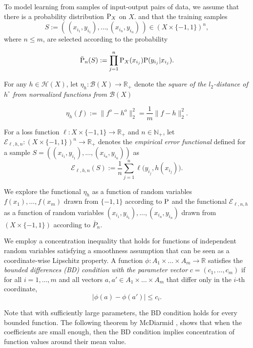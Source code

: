 \documentclass{elsarticle}
\def\n{\noindent}
\def\P{{\rm P}}
\def\cE{{\mathcal E}}
\def\cH{{\mathcal H}}
\def\cB{{\mathcal B}}
\def\bR{{\mathbb R}}
\def\bN{{\mathbb N}}
\def\n{\noindent}
\begin{document}
To model learning from samples of input-output pairs of data, we assume that there is a probability distribution $\P_X$ on $X$. and that the training samples
$$S := ( \, (x_{i_1},y_{i_1}), \dots, (x_{i_n}, y_{i_n}) \, ) \in (X \times \{-1,1\})^n,$$
\n where $n \leq m$, are selected according to the probability

$${\bar \P_n}(S) := \prod_{j=1}^n \P_X(x_{i_j})\P(y_{i_j}| x_{i_j}).$$

\n For any $h \in \cH(X)$,  let
$\eta_{h}: \cB(X) \to \bR_+$ denote the {\em square of the $l_2$-distance of $h^{\circ}$ from normalized functions from $\cB(X)$}

$$\eta_{h}(f) := \| f^o - h^o \|^2_2 = \frac{1}{m} \| f -h\|^2_2.$$

\n For a loss function $\ell: X \times \{-1,1\} \to \bR_+$  and $n \in\bN_+$, let
  $\cE_{\ell,h,n}: (X \times \{-1,1\})^n \to \bR_+$ denotes the {\em empirical error functional}
defined for a sample $S = ( (x_{i_1},y_{i_1}), \dots, (x_{i_n}, y_{i_n}) )$ as
 $$\cE_{\ell,h,n}(S) := \frac{1}{n} \sum_{j=1}^n \ell \bigl ( y_{i_j},h(x_{i_j}) \bigr ).$$


\n We explore the functional $\eta_{h}$ as a function of random variables $f(x_1), \dots, f(x_m)$ drawn from $\{-1,1\}$ according to ${\P}$ and the functional $\cE_{\ell,n,h}$  as a function  of random variables $(x_{i_1}, y_{i_1}), \dots, (x_{i_n}, y_{i_n})$ drawn from $(X \times \{-1,1\})$ according to ${\bar P}_n$.

We employ a concentration inequality  that holds for functions of independent random variables satisfying a smoothness assumption that can be seen as a coordinate-wise Lipschitz property.
A function
$\phi: A_1 \times \ldots \times A_m \to \bR$ satisfies the {\em bounded differences (BD) condition
with the parameter vector} $c= (c_1, \dots, c_m)$ if for all $i=1, \dots, m$ and all vectors $a, a' \in  A_1 \times \ldots \times A_m$ that differ only in the $i$-th coordinate,
 \begin{equation}
 | \phi(a) - \phi(a')| \leq c_i.
\label{eq:BD}
\end{equation}

\n Note that with sufficiently large parameters, the BD condition holds for every bounded function. The following theorem by McDiarmid \cite[p.70]{dupa09},\cite{mc89} shows that when the coefficients are small enough, then the BD condition implies concentration of function values around their mean value.
\end{document}
